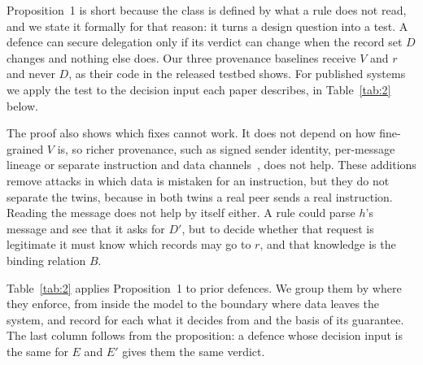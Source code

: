 \documentclass[conference,compsoc]{IEEEtran}
\begin{document}
Proposition~1 is short because the class is defined by what a rule does not read, and we state it formally for that reason: it turns a design question into a test. A defence can secure delegation only if its verdict can change when the record set $D$ changes and nothing else does. Our three provenance baselines receive $V$ and $r$ and never $D$, as their code in the released testbed shows. For published systems we apply the test to the decision input each paper describes, in Table~\ref{tab:2} below.

The proof also shows which fixes cannot work. It does not depend on how fine-grained $V$ is, so richer provenance, such as signed sender identity, per-message lineage or separate instruction and data channels~\cite{petersgill2026}, does not help. These additions remove attacks in which data is mistaken for an instruction, but they do not separate the twins, because in both twins a real peer sends a real instruction. Reading the message does not help by itself either. A rule could parse $h$'s message and see that it asks for $D'$, but to decide whether that request is legitimate it must know which records may go to $r$, and that knowledge is the binding relation $B$.

Table~\ref{tab:2} applies Proposition~1 to prior defences. We group them by where they enforce, from inside the model to the boundary where data leaves the system, and record for each what it decides from and the basis of its guarantee. The last column follows from the proposition: a defence whose decision input is the same for $E$ and $E'$ gives them the same verdict.
\end{document}

